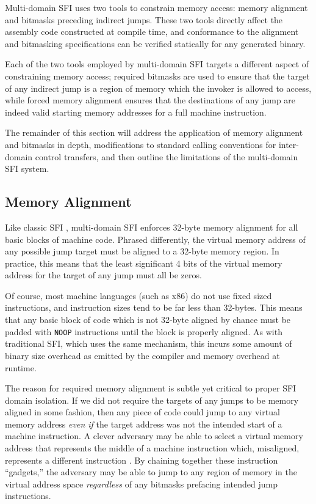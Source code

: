 \documentclass[12pt]{IEEEtran}
\begin{document}
Multi-domain SFI uses two tools to constrain memory access: memory alignment and bitmasks preceding indirect jumps. These two tools directly affect the assembly code constructed at compile time, and conformance to the alignment and bitmasking specifications can be verified statically for any generated binary.

Each of the two tools employed by multi-domain SFI targets a different aspect of constraining memory access; required bitmasks are used to ensure that the target of any indirect jump is a region of memory which the invoker is allowed to access, while forced memory alignment ensures that the destinations of any jump are indeed valid starting memory addresses for a full machine instruction.

The remainder of this section will address the application of memory alignment and bitmasks in depth, modifications to standard calling conventions for inter-domain control transfers, and then outline the limitations of the multi-domain SFI system.

\subsection{Memory Alignment}

Like classic SFI \cite{mccamant_evaluating_2006, yee_native_2009, sehr_adapting_2010}, multi-domain SFI enforces 32-byte memory alignment for all basic blocks of machine code. Phrased differently, the virtual memory address of any possible jump target must be aligned to a 32-byte memory region. In practice, this means that the least significant 4 bits of the virtual memory address for the target of any jump must all be zeros.

Of course, most machine languages (such as x86) do not use fixed sized instructions, and instruction sizes tend to be far less than 32-bytes. This means that any basic block of code which is not 32-byte aligned by chance must be padded with \texttt{NOOP} instructions until the block is properly aligned. As with traditional SFI, which uses the same mechanism, this incurs some amount of binary size overhead as emitted by the compiler and memory overhead at runtime.

The reason for required memory alignment is subtle yet critical to proper SFI domain isolation. If we did not require the targets of any jumps to be memory aligned in some fashion, then any piece of code could jump to any virtual memory address \textit{even if} the target address was not the intended start of a machine instruction. A clever adversary may be able to select a virtual memory address that represents the middle of a machine instruction which, misaligned, represents a different instruction \cite{roemer_return-oriented_2012}. By chaining together these instruction ``gadgets,'' the adversary may be able to jump to any region of memory in the virtual address space \textit{regardless} of any bitmasks prefacing intended jump instructions.
\end{document}
